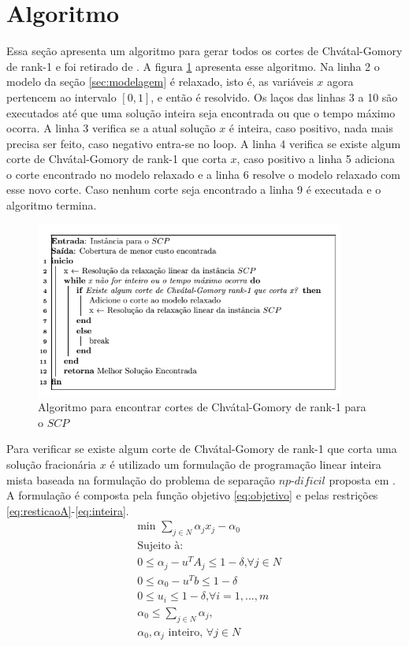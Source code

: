 \section{Algoritmo}\label{sec:algoritmo} 
Essa seção apresenta um algoritmo para gerar todos os cortes de Chvátal-Gomory de rank-1 e foi retirado
de \cite{Fischetti07}. A figura \ref{AlgoritmoRank1} apresenta esse algoritmo. Na linha 2 o modelo da seção
\ref{sec:modelagem} é relaxado, isto é, as variáveis $x$ agora pertencem ao intervalo $[0,1]$, e então é 
resolvido. Os laços das linhas 3 a 10 são executados até que uma solução inteira seja encontrada ou 
que o tempo máximo ocorra. A linha 3 verifica se a atual solução $x$ é inteira, caso positivo, nada mais 
precisa ser feito, caso negativo entra-se no loop. A linha 4 verifica se existe algum corte de 
Chvátal-Gomory de rank-1 que corta $x$, caso positivo a linha 5 adiciona o corte encontrado no 
modelo relaxado e a linha 6 resolve o modelo relaxado com esse novo corte. Caso nenhum corte seja
encontrado a linha 9 é executada e o algoritmo termina.
\begin{figure}
\centering
\includegraphics[width=4in]{AlgoritmoRank1.PNG}
\caption{Algoritmo para encontrar cortes de Chvátal-Gomory de rank-1 para o $SCP$}
\label{AlgoritmoRank1}
\end{figure}
Para verificar se existe algum corte de Chvátal-Gomory de rank-1 que corta uma solução fracionária
$x$ é utilizado um formulação de programação linear inteira mista baseada na formulação do problema de separação $np$-$dificil$ proposta em
\cite{Fischetti07}. A formulação
é composta pela função objetivo \eqref{eq:objetivo} e pelas restrições \eqref{eq:resticaoA}-\eqref{eq:inteira}.
\begin{align}
    & \text{min } \sum_{j \in N} \alpha_jx_j - \alpha_0 \label{eq:objetivo} \\
    & \text{Sujeito à:} \nonumber \\
    & 0 \le \alpha_j - u^TA_j  \le 1 -\delta \textrm{,} \forall j \in N \label{eq:resticaoA} \\ 
    & 0 \le \alpha_0 - u^Tb \le 1 -\delta \label{eq:b} \\
    & 0 \le u_i \le 1 -\delta \textrm{,} \forall i=1,...,m \label{eq:u} \\
    & \alpha_0 \le \sum_{j \in N} \alpha_j \textrm{,} \label{eq:mantem_binarias} \\
    & \alpha_0, \alpha_j \textrm{ inteiro, } \forall j \in N \label{eq:inteira}
\end{align}
